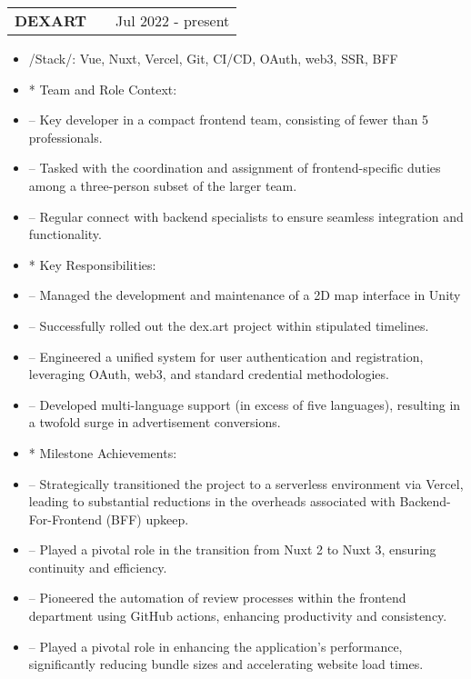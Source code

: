 \documentclass[a4paper,12pt]{article}
\makeatletter
\newenvironment{joblong}[2]
    {
    \begin{tabularx}{\linewidth}{@{}l X r@{}}
    \textbf{#1} & \hfill &  #2 \\[3.75pt]
    \end{tabularx}
    \begin{minipage}[t]{\linewidth}
    \begin{itemize}[nosep,after=\strut, leftmargin=1em, itemsep=3pt,label=--]
    }
    {
    \end{itemize}
    \end{minipage}    
    }
\makeatother
\begin{document}
\begin{joblong}{DEXART}{Jul 2022 - present}
  \item /Stack/: {Vue, Nuxt, Vercel, Git, CI/CD, OAuth, web3, SSR, BFF}
  
  \item [*] Team and Role Context:
  \item [--] Key developer in a compact frontend team, consisting of fewer than 5 professionals. 
  \item [--] Tasked with the coordination and assignment of frontend-specific duties among a three-person subset of the larger team.
  \item [--] Regular connect with backend specialists to ensure seamless integration and functionality.

  \item [*] Key Responsibilities:
  \item [--] Managed the development and maintenance of a 2D map interface in Unity
  \item [--] Successfully rolled out the dex.art project within stipulated timelines.
  \item [--] Engineered a unified system for user authentication and registration, leveraging OAuth, web3, and standard credential methodologies.
  \item [--] Developed multi-language support (in excess of five languages), resulting in a twofold surge in advertisement conversions.

  \item [*] Milestone Achievements:
  \item [--] Strategically transitioned the project to a serverless environment via Vercel, leading to substantial reductions in the overheads associated with Backend-For-Frontend (BFF) upkeep.
  \item [--] Played a pivotal role in the transition from Nuxt 2 to Nuxt 3, ensuring continuity and efficiency.
  \item [--] Pioneered the automation of review processes within the frontend department using GitHub actions, enhancing productivity and consistency.
  \item [--] Played a pivotal role in enhancing the application's performance, significantly reducing bundle sizes and accelerating website load times.

\end{joblong}
\end{document}
